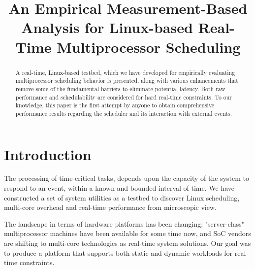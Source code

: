 \documentclass[conference]{IEEEtran}
\begin{document}
\title{An Empirical Measurement-Based Analysis for Linux-based Real-Time Multiprocessor Scheduling}

\author{ 
\and {} }

\maketitle

\begin{abstract}
A real-time, Linux-based testbed, which we have developed for empirically evaluating multiprocessor
scheduling behavior is presented, along with various enhancements that remove some of the fundamental
barriers to eliminate potential latency. Both raw performance and schedulability are considered for
hard real-time constraints. To our knowledge, this paper is the first attempt by anyone to obtain
comprehensive performance results regarding the scheduler and its interaction with external events.
\end{abstract}

\section{Introduction}

The processing of time-critical tasks, depends upon the capacity of the system to respond to an event, within
a known and bounded interval of time. We have constructed a set of system utilities as a testbed to discover
Linux scheduling, multi-core overhead and real-time performance from microscopic view.

The landscape in terms of hardware platforms has been changing: "server-class" multiprocessor machines have
been available for some time now, and SoC vendors are shifting to multi-core technologies as real-time system
solutions. Our goal was to produce a platform that supports both static and dynamic workloads for real-time constraints.
\end{document}
